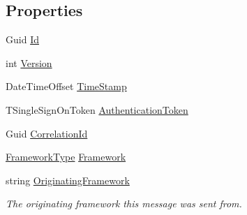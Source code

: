 \subsection*{Properties}
\begin{DoxyCompactItemize}
\item 
Guid \hyperlink{classCqrs_1_1WebApi_1_1HelpPageConfig_1_1UserCreatedEvent_a954a41a7026b78fbb455ba20ff1e055b_a954a41a7026b78fbb455ba20ff1e055b}{Id}
\item 
int \hyperlink{classCqrs_1_1WebApi_1_1HelpPageConfig_1_1UserCreatedEvent_a944701cbbb3eb260c43058d5f6dd5995_a944701cbbb3eb260c43058d5f6dd5995}{Version}
\item 
Date\+Time\+Offset \hyperlink{classCqrs_1_1WebApi_1_1HelpPageConfig_1_1UserCreatedEvent_aabf0ce7b7e8956966e02553d0e93e537_aabf0ce7b7e8956966e02553d0e93e537}{Time\+Stamp}
\item 
T\+Single\+Sign\+On\+Token \hyperlink{classCqrs_1_1WebApi_1_1HelpPageConfig_1_1UserCreatedEvent_aa8d10ff30ee35f23533da85c0dac8d88_aa8d10ff30ee35f23533da85c0dac8d88}{Authentication\+Token}
\item 
Guid \hyperlink{classCqrs_1_1WebApi_1_1HelpPageConfig_1_1UserCreatedEvent_ae9d6022467b17819740c0c69f7a749bf_ae9d6022467b17819740c0c69f7a749bf}{Correlation\+Id}
\item 
\hyperlink{namespaceCqrs_1_1Messages_af06a7e6cd2609043d0f2f5f3419f81e3_af06a7e6cd2609043d0f2f5f3419f81e3}{Framework\+Type} \hyperlink{classCqrs_1_1WebApi_1_1HelpPageConfig_1_1UserCreatedEvent_afaf98b2dbd5a99958b769f154b7f4638_afaf98b2dbd5a99958b769f154b7f4638}{Framework}
\item 
string \hyperlink{classCqrs_1_1WebApi_1_1HelpPageConfig_1_1UserCreatedEvent_a99344449aa7d37839eac84dbea4fe27e_a99344449aa7d37839eac84dbea4fe27e}{Originating\+Framework}
\begin{DoxyCompactList}\small\item\em The originating framework this message was sent from. \end{DoxyCompactList}\item 

\end{DoxyCompactItemize}
